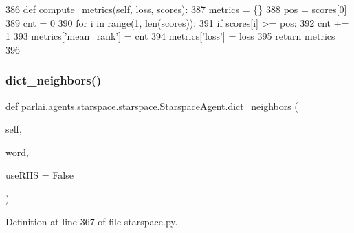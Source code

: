 \begin{DoxyCode}
386     \textcolor{keyword}{def }compute\_metrics(self, loss, scores):
387         metrics = \{\}
388         pos = scores[0]
389         cnt = 0
390         \textcolor{keywordflow}{for} i \textcolor{keywordflow}{in} range(1, len(scores)):
391             \textcolor{keywordflow}{if} scores[i] >= pos:
392                 cnt += 1
393         metrics[\textcolor{stringliteral}{'mean\_rank'}] = cnt
394         metrics[\textcolor{stringliteral}{'loss'}] = loss
395         \textcolor{keywordflow}{return} metrics
396 
\end{DoxyCode}
\mbox{\label{classparlai_1_1agents_1_1starspace_1_1starspace_1_1StarspaceAgent_abf3eb0a95a46ba21d819ef09465390c3}} 
\subsubsection{\texorpdfstring{dict\+\_\+neighbors()}{dict\_neighbors()}}
{\footnotesize\ttfamily def parlai.\+agents.\+starspace.\+starspace.\+Starspace\+Agent.\+dict\+\_\+neighbors (\begin{DoxyParamCaption}\item[{}]{self,  }\item[{}]{word,  }\item[{}]{use\+R\+HS = {\ttfamily False} }\end{DoxyParamCaption})}



Definition at line 367 of file starspace.\+py.


